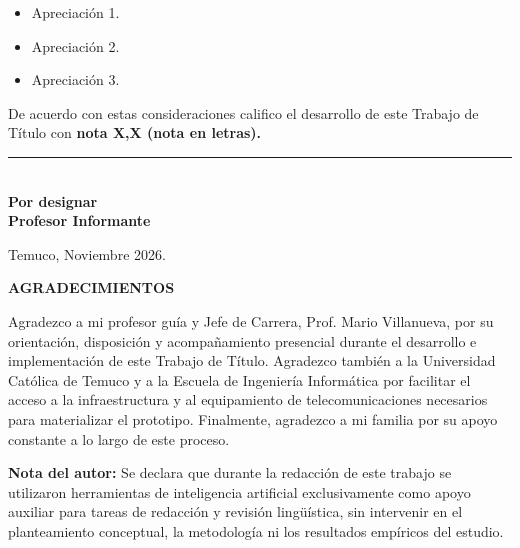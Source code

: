 \documentclass[12pt,oneside,openany,spanish,oldfontcommands]{memoir}
\begin{document}
\begin{itemize}
    \item Apreciación 1.
    \item Apreciación 2.
    \item Apreciación 3.
\end{itemize}

De acuerdo con estas consideraciones califico el desarrollo de este Trabajo de Título con
\textbf{nota X,X (nota en letras).}

\vspace{1cm}

\begin{flushright}
\rule{65mm}{0.2mm}\\
\textbf{Por designar}\\
\textbf{Profesor Informante}
\end{flushright}

\vspace{1cm}

Temuco, Noviembre 2026.

\clearpage
\thispagestyle{empty}

\begin{center}
    \textbf{AGRADECIMIENTOS}
\end{center}

\vspace{1cm}

Agradezco a mi profesor guía y Jefe de Carrera, Prof. Mario Villanueva, por su orientación,
disposición y acompañamiento presencial durante el desarrollo e implementación de este Trabajo
de Título. Agradezco también a la Universidad Católica de Temuco y a la Escuela de Ingeniería
Informática por facilitar el acceso a la infraestructura y al equipamiento de telecomunicaciones
necesarios para materializar el prototipo. Finalmente, agradezco a mi familia por su apoyo
constante a lo largo de este proceso.

\vfill

\noindent\textbf{Nota del autor:} \small Se declara que durante la redacción de este trabajo se utilizaron herramientas de inteligencia artificial exclusivamente como apoyo auxiliar para tareas de redacción y revisión lingüística, sin intervenir en el planteamiento conceptual, la metodología ni los resultados empíricos del estudio.

\clearpage
{}
\pagestyle{empty}
\end{document}
